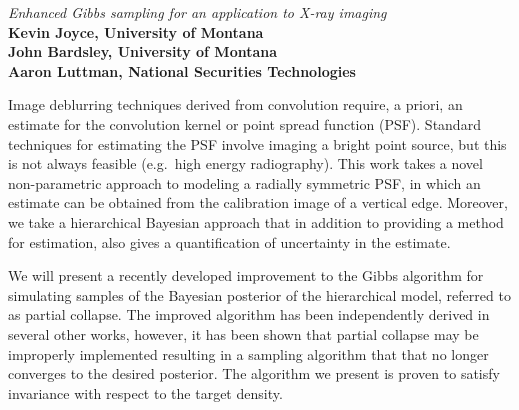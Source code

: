 \documentclass[12pt]{article}
\renewcommand{\abstract}[4]{{\noindent\it #3}\\{\bf #2}\\[6pt] {\upshape #4}}
\newcommand{\presenter}{$^{\dagger}$}
\newcommand{\gradstudent}{$^{**}$}
\newcommand{\undergrad}{$^{*}$}
\begin{document}
%
%
%
%
%
%
%
%

\abstract{pompousb} %
{%
Kevin Joyce, University of Montana\\ 
John Bardsley, University of Montana\\
Aaron Luttman, National Securities Technologies
}
{%
Enhanced Gibbs sampling for an application to X-ray imaging
}
{%
Image deblurring techniques derived from convolution require, a priori, an estimate for the convolution kernel or point spread function (PSF).
Standard techniques for estimating the PSF involve imaging a bright point source, but this is not always feasible (e.g.~high energy radiography).  
This work takes a novel non-parametric approach to modeling a radially symmetric PSF, in which an estimate can be obtained from the calibration image of a vertical edge.
Moreover, we take a hierarchical Bayesian approach that in addition to providing a method for estimation, also gives a quantification of uncertainty in the estimate.

We will present a recently developed improvement to the Gibbs algorithm for simulating samples of the Bayesian posterior of the hierarchical model, referred to as partial collapse.
The improved algorithm has been independently derived in several other works, however, it has been shown that partial collapse may be improperly implemented resulting in a sampling algorithm that that no longer converges to the desired posterior.
The algorithm we present is proven to satisfy invariance with respect to the target density.

}

%
\end{document}
